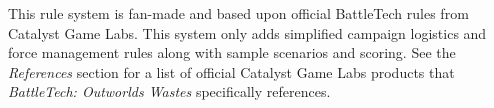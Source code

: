 This rule system is fan-made and based upon official BattleTech rules from Catalyst Game Labs.
This system only adds simplified campaign logistics and force management rules along with sample scenarios and scoring.
See the \emph{References} section for a list of official Catalyst Game Labs products that \emph{BattleTech: Outworlds Wastes} specifically references.
